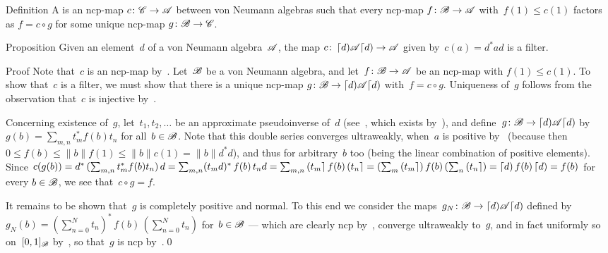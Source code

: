 \documentclass[a]{subfiles}
\begin{document}
\begin{parsec}%
\begin{point}{Definition}%
A 
is an ncp-map $c\colon \mathscr{C}\to\mathscr{A}$
between von Neumann algebras
such that every ncp-map $f\colon \mathscr{B}\to\mathscr{A}$
with~$f(1)\leq c(1)$
factors as $f=c\circ g$
for some unique ncp-map $g \colon \mathscr{B}\to\mathscr{C}$.
\end{point}
\begin{point}{Proposition}%
Given an element~$d$ of a von Neumann algebra~$\mathscr{A}$,
the map $c\colon \left\lceil d\right)\!\mathscr{A}\!\left\lceil d\right)\to\mathscr{A}$
given by~$c(a)=d^*ad$
is a filter.
\begin{point}{Proof}%
Note that~$c$ is an ncp-map by~.
Let~$\mathscr{B}$ be a von Neumann algebra,
and let~$f\colon \mathscr{B}\to\mathscr{A}$ be an ncp-map
with $f(1)\leq c(1)$.
To show that~$c$ is a filter,
we must show that there is a unique ncp-map
$g\colon \mathscr{B}\to
\left\lceil d\right)\!\mathscr{A}\!\left\lceil d\right)$
with~$f=c\circ g$.
Uniqueness of~$g$ follows from the observation
that~$c$ is injective by~.

Concerning existence of~$g$,
let~$t_1,t_2,\dotsc$ be an approximate pseudoinverse of~$d$
(see~,
which exists by~),
and define~$g\colon \mathscr{B}\to\left\lceil d\right)\!\mathscr{A}\!\left\lceil d\right)$
by~$g(b)=\sum_{m,n} t_m^* f(b) t_n$
for all~$b\in \mathscr{B}$.
Note that this double series converges ultraweakly,
when~$a$ is positive
by~\TODO{}
(because then $0\leq f(b)\leq \|b\|f(1)\leq \|b\|c(1)=\|b\|d^*d$),
and thus for arbitrary~$b$ too (being the linear combination of
positive elements).
Since $c(g(b))=
d^* \,(\sum_{m,n} t_m^* f(b)t_n)\, d
= \sum_{m,n} (t_m d)^* \,f(b)\, t_nd
= \sum_{m,n} \left(t_m\right\rceil f(b) \left(t_n\right\rceil
= (\sum_m \left(t_m\right\rceil) \,f(b)\, (\sum_n \left(t_n\right\rceil)
= \left\lceil d\right) f(b)\left\lceil d\right)
= f(b)$ for every $b\in\mathscr{B}$, we see that~$c\circ g = f$.

It remains to be shown that~$g$ is completely positive
and normal.
To this end
we consider
the maps~$g_N\colon \mathscr{B}\to\left\lceil d\right)\!\mathscr{A}\!\left\lceil d\right)$
defined by~$g_N(b)= (\sum_{n=0}^Nt_n)^*\, f(b)\, (\sum_{n=0}^N t_n)$
for~$b\in\mathscr{B}$ --- 
which are clearly ncp by~,
converge ultraweakly to~$g$,
and in fact uniformly so on~$[0,1]_{\mathscr{B}}$ by~,
so that~$g$ is ncp by~.\qed
\end{point}
\end{point}
\end{parsec}
\begin{parsec}
\end{parsec}
\end{document}
